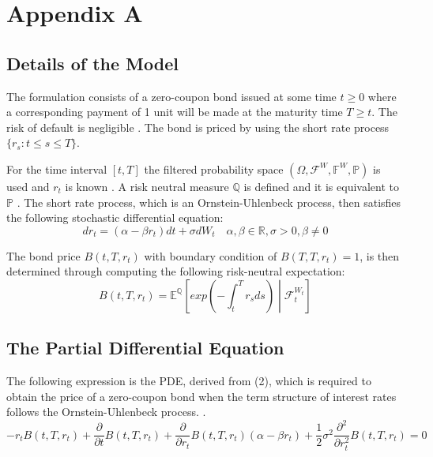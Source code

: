 \documentclass[12pt,a4paper]{article}
\begin{document}
	
	\newpage
	
		
	
	\newpage
	\appendix
	\section{Appendix A}
	\label{sec: Appendix A}
	\subsection{Details of the Model}
	\label{subsec: Details}
	The formulation consists of a zero-coupon bond issued at some time $t \geq 0$ where a corresponding payment of 1 unit will be made at the maturity time $T \geq t$. The risk of default is negligible \citep{shreve2004stochastic}. The bond is priced by using the short rate process $\{r_{s}:t \leq s \leq T\}$.
	
	For the time interval $[t,T]$ the filtered probability space $(\Omega, \mathcal{F}^W,\mathbb{F}^W,\mathbb{P})$ is used and $r_t$ is known \citep{mamon2004three}. A risk neutral measure $\mathbb{Q}$ is defined and it is equivalent to $\mathbb{P}$ \citep{shreve2004stochastic}. The short rate process, which is an Ornstein-Uhlenbeck process, then satisfies the following stochastic differential equation: 
	\begin{equation}
	dr_{t} = (\alpha-\beta r_{t})dt + \sigma dW_{t} \quad \alpha, \beta \in \mathbb{R}, \sigma>0, \beta \neq 0
	\end{equation}
	
	
	The bond price $B(t,T,r_t)$ with boundary condition of $B(T,T,r_t) = 1$, is then determined through computing the following risk-neutral expectation:
	\begin{equation}
	B(t,T,r_t) = \mathbb{E}^{\mathbb{Q}}\left[exp\left(-\int_{t}^{T}r_{s} ds\right)\middle\vert\mathcal{F}_{t}^{W_{t}}\right]
	\end{equation}
	
	
	\subsection{The Partial Differential Equation}
	\label{subsec: PDE}
	The following expression is the PDE, derived from (2), which is required to obtain the price of a zero-coupon bond when the term structure of interest rates follows the Ornstein-Uhlenbeck process. .
	$$\boxed{-r_t B(t,T,r_t) + \frac{\partial}{\partial t} B(t,T,r_t) + \frac{\partial}{\partial r_t}B(t,T,r_t)(\alpha - \beta r_t) +\frac{1}{2} \sigma^2 \frac{\partial^2}{\partial r_t^2} B(t,T,r_t) = 0 }$$
	
\end{document}
